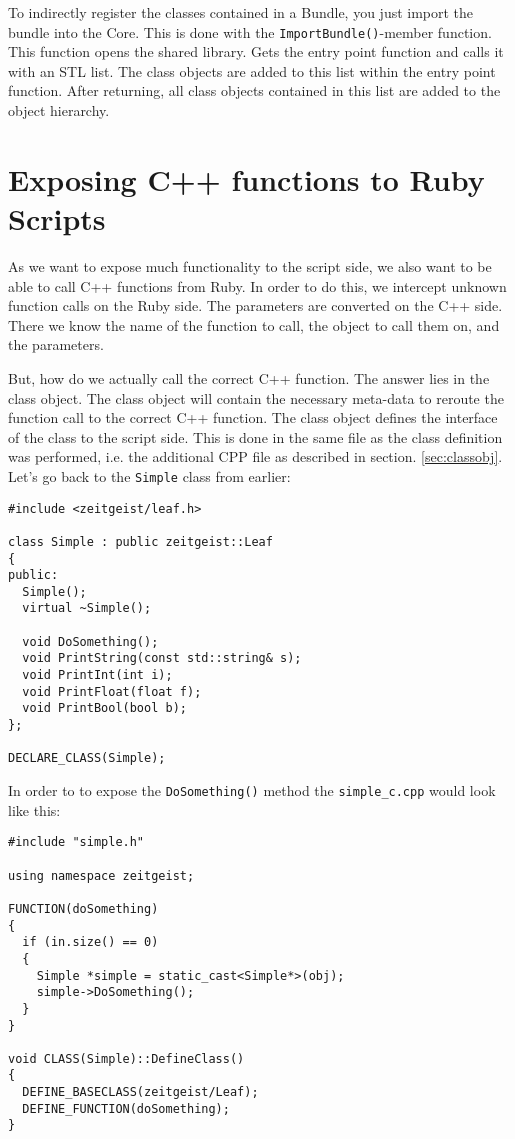 To indirectly register the classes contained in a Bundle, you just
import the bundle into the Core. This is done with the
\texttt{ImportBundle()}-member function. This function opens the shared
library. Gets the entry point function and calls it with an STL
list. The class objects are added to this list within the entry point
function. After returning, all class objects contained in this list
are added to the object hierarchy.

\section{Exposing C++ functions to Ruby Scripts}

As we want to expose much functionality to the script side, we also
want to be able to call C++ functions from Ruby. In order to do this,
we intercept unknown function calls on the Ruby side. The parameters
are converted on the C++ side. There we know the name of the function
to call, the object to call them on, and the parameters. 

But, how do we actually call the correct C++ function. The answer lies
in the class object. The class object will contain the necessary
meta-data to reroute the function call to the correct C++
function. The class object defines the interface of the class to the
script side. This is done in the same file as the class definition was
performed, i.e. the additional CPP file as described in section.
\ref{sec:classobj}. Let's go back to the \texttt{Simple} class from earlier:

\begin{verbatim}
#include <zeitgeist/leaf.h>

class Simple : public zeitgeist::Leaf
{
public:
  Simple();
  virtual ~Simple();
  
  void DoSomething();
  void PrintString(const std::string& s);
  void PrintInt(int i);
  void PrintFloat(float f);
  void PrintBool(bool b);
};

DECLARE_CLASS(Simple);
\end{verbatim}

In order to to expose the \texttt{DoSomething()} method the
\texttt{simple\_c.cpp} would look like this:

\begin{verbatim}
#include "simple.h"

using namespace zeitgeist;

FUNCTION(doSomething)
{
  if (in.size() == 0)
  {
    Simple *simple = static_cast<Simple*>(obj);
    simple->DoSomething();
  }
}

void CLASS(Simple)::DefineClass()
{
  DEFINE_BASECLASS(zeitgeist/Leaf);
  DEFINE_FUNCTION(doSomething);
}
\end{verbatim}



